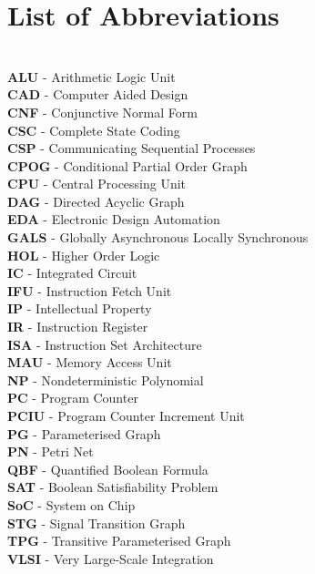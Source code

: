 \section*{List of Abbreviations}
~
\\
\textbf{ALU} - Arithmetic Logic Unit
\\
\textbf{CAD} - Computer Aided Design
\\
\textbf{CNF} - Conjunctive Normal Form
\\
\textbf{CSC} - Complete State Coding
\\
\textbf{CSP} - Communicating Sequential Processes
\\
\textbf{CPOG} - Conditional Partial Order Graph
\\
\textbf{CPU} - Central Processing Unit
\\
\textbf{DAG} - Directed Acyclic Graph
\\
\textbf{EDA} - Electronic Design Automation
\\
\textbf{GALS} - Globally Asynchronous Locally Synchronous
\\
\textbf{HOL} - Higher Order Logic
\\
\textbf{IC} - Integrated Circuit
\\
\textbf{IFU} - Instruction Fetch Unit
\\
\textbf{IP} - Intellectual Property
\\
\textbf{IR} - Instruction Register
\\
\textbf{ISA} - Instruction Set Architecture
\\
\textbf{MAU} - Memory Access Unit
\\
\textbf{NP} - Nondeterministic Polynomial
\\
\textbf{PC} - Program Counter
\\
\textbf{PCIU} - Program Counter Increment Unit
\\
\textbf{PG} - Parameterised Graph
\\
\textbf{PN} - Petri Net
\\
\textbf{QBF} - Quantified Boolean Formula
\\
\textbf{SAT} - Boolean Satisfiability Problem
\\
\textbf{SoC} - System on Chip
\\
\textbf{STG} - Signal Transition Graph
\\
\textbf{TPG} - Transitive Parameterised Graph
\\
\textbf{VLSI} - Very Large-Scale Integration

